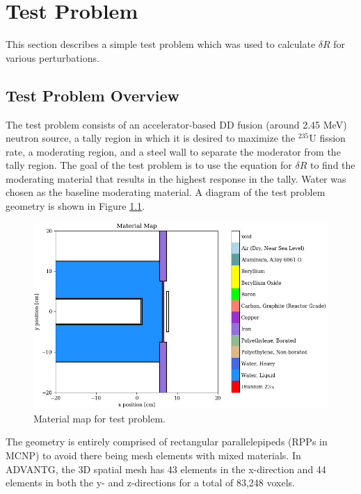 \chapter{Test Problem}
\label{chap:testprob}

This section describes a simple test problem which was used to calculate $\delta R$ for various perturbations.

\section{Test Problem Overview}
\label{sec:bg:tp:overview}

The test problem consists of an accelerator-based DD fusion (around 2.45 MeV) neutron source, a tally region in which it is desired to maximize the ${}^{235}\text{U}$ fission rate, a moderating region, and a steel wall to separate the moderator from the tally region.
The goal of the test problem is to use the equation for $\delta R$ to find the moderating material that results in the highest response in the tally.
Water was chosen as the baseline moderating material.
A diagram of the test problem geometry is shown in Figure \ref{fig:testprob:material_map}.

\begin{figure}[h!]
  \centering
  \includegraphics[width=\linewidth]{content/testprob/material_map.png}
  \caption{Material map for test problem.}
  \label{fig:testprob:material_map}
\end{figure}

The geometry is entirely comprised of rectangular parallelepipeds (RPPs in MCNP) to avoid there being mesh elements with mixed materials.
In ADVANTG, the 3D spatial mesh has 43 elements in the x-direction and 44 elements in both the y- and z-directions for a total of 83,248 voxels.

